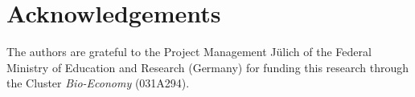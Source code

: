 \section{Acknowledgements}
The authors are grateful to the Project Management Jülich of the Federal Ministry of Education and Research (Germany) for funding this research through the Cluster \textit{Bio-Economy} (031A294).


\address{Kai Husmann\\
	Department of Forest Economics and Forest Management\\	
    University of Goettingen\\
    Germany\\}

\address{Alexander Lange\\
	Chair of Econometrics\\
    University of Goettingen\\
    Germany\\}

\address{Elmar Spiegel\\
	Chair of Statistics\\
    University of Goettingen\\
    Germany\\}
